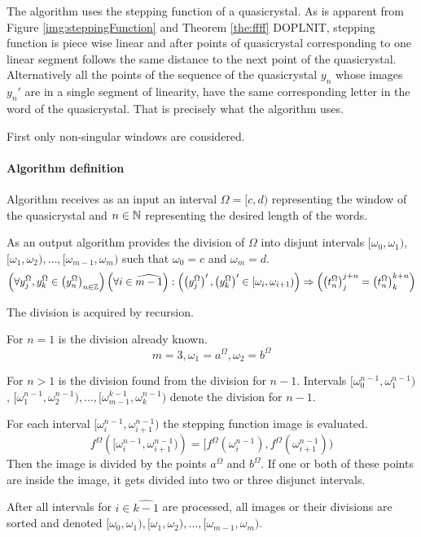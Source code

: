 \documentclass[text.tex]{subfiles}
\begin{document}
The algorithm uses the stepping function of a quasicrystal. As is apparent from Figure \ref{img:steppingFunction} and Theorem \ref{the:ffff} DOPLNIT, stepping function is piece wise linear and after points of quasicrystal corresponding to one linear segment follows the same distance to the next point of the quasicrystal. Alternatively all the points of the sequence of the quasicrystal $y_n$ whose images $y_n'$ are in a single segment of linearity, have the same corresponding letter in the word of the quasicrystal. That is precisely what the algorithm uses. 

First only non-singular windows are considered.

\paragraph{Algorithm definition}
Algorithm receives as an input an interval $\Omega = [c,d)$ representing the window of the quasicrystal and $n\in\mathbb{N}$ representing the desired length of the words.

As an output algorithm provides the division of $\Omega$ into disjunt intervals $[\omega_0,\omega_1)$, $[\omega_1,\omega_2), \dots, [\omega_{m-1},\omega_m)$ such that $\omega_0 = c$ and $\omega_m = d$.
$$\left(\forall y_j^\Omega,y_k^\Omega\in\left(y_n^\Omega\right)_{n\in\mathbb{Z}} \right)\left(\forall i\in\widehat{m-1}\right): \left(\left({y_j^\Omega}\right)',\left({y_k^\Omega}\right)' \in [\omega_i,\omega_{i+1})\right) \Rightarrow \left(\left(t_n^\Omega\right)_j^{j+n} = \left(t_n^\Omega\right)_k^{k+n}\right)$$

The division is acquired by recursion. 

For $n=1$ is the division already known.
$$m=3, \omega_1 = a^\Omega, \omega_2 = b^\Omega$$

For $n>1$ is the division found from the division for $n-1$.
Intervals 
$[\omega_0^{n-1},\omega_1^{n-1})$, $[\omega_1^{n-1},\omega_2^{n-1}), \dots, [\omega_{m-1}^{k-1},\omega_{k}^{n-1})$ denote the division for $n-1$.

For each interval $[\omega_i^{n-1},\omega_{i+1}^{n-1})$ the stepping function image is evaluated. 
$$f^\Omega\left([\omega_i^{n-1},\omega_{i+1}^{n-1})\right) = [f^\Omega(\omega_i^{n-1}),f^\Omega(\omega_{i+1}^{n-1}))$$
Then the image is divided by the points $a^\Omega$ and $b^\Omega$. If one or both of these points are inside the image, it gets divided into two or three disjunct intervals. 

After all intervals for $i\in \widehat{k-1}$ are processed, all images or their divisions are sorted and denoted $[\omega_0,\omega_1), [\omega_1,\omega_2), \dots, [\omega_{m-1},\omega_m)$.
\end{document}
